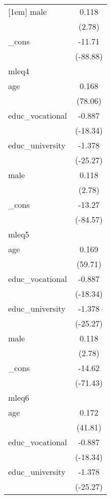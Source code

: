{\begin{tabular}{l*{1}{c}}
[1em]
male        &       0.118\sym{**} \\
            &      (2.78)         \\
[1em]
\_cons      &      -11.71\sym{***}\\
            &    (-88.88)         \\
\hline
mleq4       &                     \\
age         &       0.168\sym{***}\\
            &     (78.06)         \\
[1em]
educ\_vocational&      -0.887\sym{***}\\
            &    (-18.34)         \\
[1em]
educ\_university&      -1.378\sym{***}\\
            &    (-25.27)         \\
[1em]
male        &       0.118\sym{**} \\
            &      (2.78)         \\
[1em]
\_cons      &      -13.27\sym{***}\\
            &    (-84.57)         \\
\hline
mleq5       &                     \\
age         &       0.169\sym{***}\\
            &     (59.71)         \\
[1em]
educ\_vocational&      -0.887\sym{***}\\
            &    (-18.34)         \\
[1em]
educ\_university&      -1.378\sym{***}\\
            &    (-25.27)         \\
[1em]
male        &       0.118\sym{**} \\
            &      (2.78)         \\
[1em]
\_cons      &      -14.62\sym{***}\\
            &    (-71.43)         \\
\hline
mleq6       &                     \\
age         &       0.172\sym{***}\\
            &     (41.81)         \\
[1em]
educ\_vocational&      -0.887\sym{***}\\
            &    (-18.34)         \\
[1em]
educ\_university&      -1.378\sym{***}\\
            &    (-25.27)         \\

\end{tabular}}
